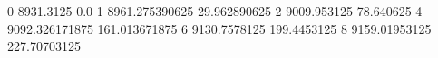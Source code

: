 0 8931.3125 0.0
1 8961.275390625 29.962890625
2 9009.953125 78.640625
4 9092.326171875 161.013671875
6 9130.7578125 199.4453125
8 9159.01953125 227.70703125
